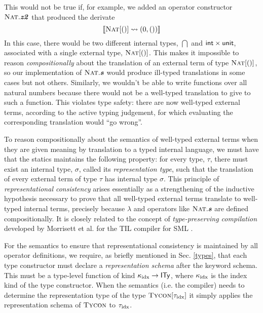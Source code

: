 \documentclass[9pt,preprint]{sigplanconf}
\begin{document}
This would not be true if, for example, we added an operator constructor $\fvar{Nat}.\opvar{z2}$ that produced the derivate $$\tden{{(0, ())}}{\ttype{Nat}{\tunit}}$$
\noindent
In this case, there would be two different internal types, $\dint$ and $\dpair{\dint}{\dunit}$,  associated with a single external type, $\ttype{Nat}{\tunit}$. This makes it impossible to reason \emph{compositionally} about the translation of an external term of type $\ttype{Nat}{\tunit}$, so our implementation of $\fvar{Nat}.\opvar{s}$ would produce ill-typed translations in some cases but not others. Similarly, we wouldn't be able to write functions over all natural numbers because there would not be a well-typed translation to give to such a function. This violates type safety: there are now well-typed external terms, according to the active typing judgement, for which evaluating the corresponding translation would ``go wrong''. 

To reason compositionally about the semantics of well-typed external terms when they are given meaning by translation to a typed internal language, we must have that the statics maintains the following property: for every  type, $\tau$, there must exist an internal type, $\sigma$, called its \emph{representation type}, such that the translation of every external term of type $\tau$ has internal type $\sigma$. This principle of \emph{representational consistency} arises essentially as a strengthening of the inductive hypothesis necessary to prove that all well-typed external terms translate to well-typed internal terms, precisely because $\lambda$ and operators like $\fvar{Nat}.\opvar{s}$ are defined compositionally. It is closely related to the concept of \emph{type-preserving compilation} developed by Morrisett et al. for the TIL compiler for SML \cite{tarditi+:til-OLD}. %

For the semantics to ensure that representational consistency is maintained by all operator definitions, we require, as briefly mentioned in Sec. \ref{types}, that each type constructor must declare a \emph{representation schema} after the keyword \textsf{schema}. This must be a type-level function of kind $\karrow{\kappaidx}{\kIType}$, where $\kappaidx$ is the index kind of the type constructor. When the semantics (i.e. the compiler) needs to determine the representation type of the type $\ttype{Tycon}{\tauidx}$ it simply applies the representation schema of $\fvar{Tycon}$ to ${\tauidx}$.
\end{document}
